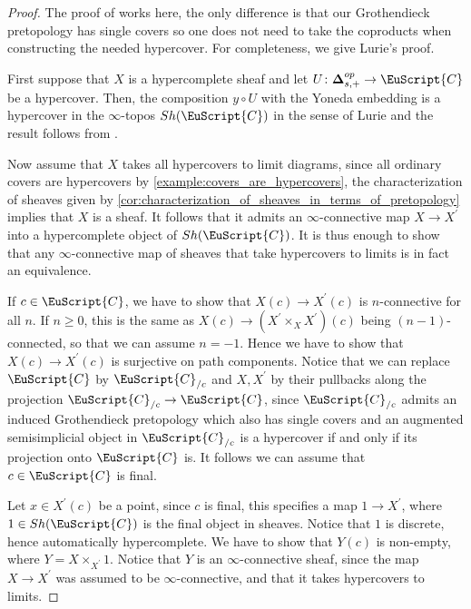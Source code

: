 \documentclass[oneside,a4paper]{amsart}
\newcommand{\euscr}[1]{\EuScript{#1}} %
\newcommand{\ccat}{\euscr{C}} %
\newcommand{\thickdelta}{\mathbf{\Delta}} %
\theoremstyle{plain}
\theoremstyle{definition}
\theoremstyle{remark}
\begin{document}
\begin{proof}
The proof of \cite[A.5.7]{lurie_spectral_algebraic_geometry} works here, the only difference is that our Grothendieck pretopology has single covers so one does not need to take the coproducts when constructing the needed hypercover. For completeness, we give Lurie's proof. 

First suppose that $X$ is a hypercomplete sheaf and let $U \colon \thickdelta_{s, +}^{op} \rightarrow \ccat$ be a hypercover. Then, the composition $y \circ U$ with the Yoneda embedding is a hypercover in the $\infty$-topos $Sh(\ccat)$ in the sense of Lurie and the result follows from \cite[6.5.3.12]{lurie_higher_topos_theory}.

Now assume that $X$ takes all hypercovers to limit diagrams, since all ordinary covers are hypercovers by \cref{example:covers_are_hypercovers}, the characterization of sheaves given by \cref{cor:characterization_of_sheaves_in_terms_of_pretopology} implies that $X$ is a sheaf. It follows that it admits an $\infty$-connective map $X \rightarrow X^{\prime}$ into a hypercomplete object of $Sh(\ccat)$. It is thus enough to show that any $\infty$-connective map of sheaves that take hypercovers to limits is in fact an equivalence. 

If $c \in \ccat$, we have to show that $X(c) \rightarrow X^{\prime}(c)$ is $n$-connective for all $n$. If $n \geq 0$, this is the same as $X(c) \rightarrow (X^{\prime} \times _{X} X^{\prime})(c)$ being $(n-1)$-connected, so that we can assume $n = -1$. Hence we have to show that $X(c) \rightarrow X^{\prime}(c)$ is surjective on path components. Notice that we can replace $\ccat$ by $\ccat _{/c}$ and $X, X^{\prime}$ by their pullbacks along the projection $\ccat _{/c} \rightarrow \ccat$, since $\ccat_{/c}$ admits an induced Grothendieck pretopology which also has single covers and an augmented semisimplicial object in $\ccat_{/c}$ is a hypercover if and only if its projection onto $\ccat$ is. It follows we can assume that $c \in \ccat$ is final. 

Let $x \in X^{\prime}(c)$ be a point, since $c$ is final, this specifies a map $1 \rightarrow X^{\prime}$, where $1 \in Sh(\ccat)$ is the final object in sheaves. Notice that $1$ is discrete, hence automatically hypercomplete. We have to show that $Y(c)$ is non-empty, where $Y = X \times _{X^{\prime}} 1$. Notice that $Y$ is an $\infty$-connective sheaf, since the map $X \rightarrow X^{\prime}$ was assumed to be $\infty$-connective, and that it takes hypercovers to limits. 


\end{proof}
\end{document}
